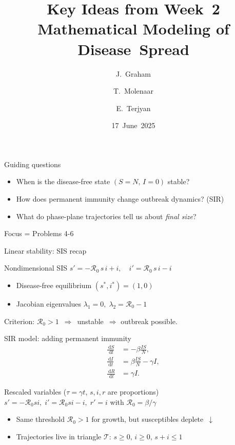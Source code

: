 \documentclass[14pt,aspectratio=169]{beamer}
\title[Modeling Disease Spread]{Key Ideas from Week 2\\Mathematical Modeling of Disease Spread}
\author{J.~Graham \and T.~Molenaar \and E.~Terjyan}
\institute[VU Amsterdam]{%
  Vrije University\\
  of Amsterdam \\
  Dynamical Systems Project}
\date{17 June 2025}
\newcommand{\dd}{\,\mathrm{d}}
\newcommand{\RR}{\mathcal{R}_0}
\begin{document}
\begin{frame}[plain]
    \titlepage
\end{frame}

\begin{frame}{Guiding questions}
    \begin{itemize}
        \item When is the disease-free state $(S=N, \, I=0)$ stable?
        \item How does permanent immunity change outbreak dynamics? (\alert{SIR})
        \item What do phase-plane trajectories tell us about \emph{final size}?
    \end{itemize}
    \vspace{0.5em}
    \alert{Focus = Problems 4-6}
\end{frame}

\begin{frame}{Linear stability: SIS recap}
  \begin{block}{Nondimensional SIS}
    $\displaystyle s'=-\RR\,s\,i+i,\quad i'=\RR\,s\,i-i$
  \end{block}
  \begin{itemize}
    \item Disease‑free equilibrium $(s^*,i^*)=(1,0)$
    \item Jacobian eigenvalues $\lambda_1=0,\;\lambda_2=\RR-1$
  \end{itemize}
  \alert{Criterion: $\RR>1$ $\Rightarrow$ unstable $\Rightarrow$ outbreak possible.}
\end{frame}
\begin{frame}{SIR model: adding permanent immunity}
  \begin{align*}
    \frac{\dd S}{\dd t} &= -\beta\frac{IS}{N},\\
    \frac{\dd I}{\dd t} &= \beta\frac{IS}{N}-\gamma I,\\
    \frac{\dd R}{\dd t} &= \gamma I.
  \end{align*}
  \begin{block}{Rescaled variables ($\tau=\gamma t$, $s,i,r$ are proportions)}
    $s'=-\RR s i,\; i'=\RR s i-i,\; r'=i$ \quad with \; $\RR=\beta/\gamma$
  \end{block}
  \begin{itemize}
    \item Same threshold $\RR>1$ for growth, but susceptibles deplete~$\downarrow$
    \item Trajectories live in triangle $\mathcal T:\, s\ge0,\,i\ge0,\,s+i\le1$
  \end{itemize}
\end{frame}
\end{document}
